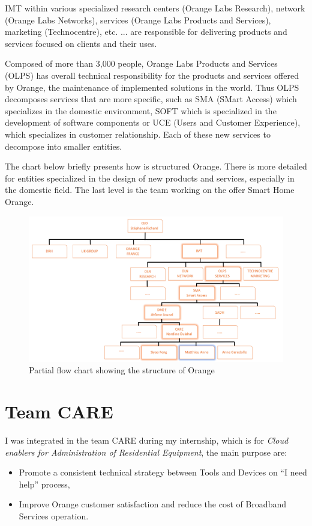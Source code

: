 IMT within various specialized research centers (Orange Labs Research), network (Orange Labs Networks), services (Orange Labs Products and Services), marketing (Technocentre), etc. ... are responsible for delivering products and services focused on clients and their uses.

Composed of more than 3,000 people, Orange Labs Products and Services (OLPS) has overall technical responsibility for the products and services offered by Orange, the maintenance of implemented solutions in the world. Thus OLPS decomposes services that are more specific, such as SMA (SMart Access) which specializes in the domestic environment, SOFT which is specialized in the development of software components or UCE (Users and Customer Experience), which specializes in customer relationship. Each of these new services to decompose into smaller entities.

The chart below briefly presents how is structured Orange. There is more detailed for entities specialized in the design of new products and services, especially in the domestic field. The last level is the team working on the offer Smart Home Orange.

\begin{figure}[htbp]
	\centering
		\includegraphics[width=15cm]{Figures/orgadiagramme.png}
	\caption[Partial flow chart showing the structure of Orange]{Partial flow chart showing the structure of Orange}
	\label{fig:structure}
\end{figure}
\section{Team CARE}

I was integrated in the team CARE during my internship, which is for \textit{Cloud enablers for Administration of Residential Equipment}, the main purpose are:
\begin{itemize}
	\item Promote a consistent technical strategy between Tools and Devices on ``I need help'' process,
	\item Improve Orange customer satisfaction and reduce the cost of Broadband Services operation.
\end{itemize}

